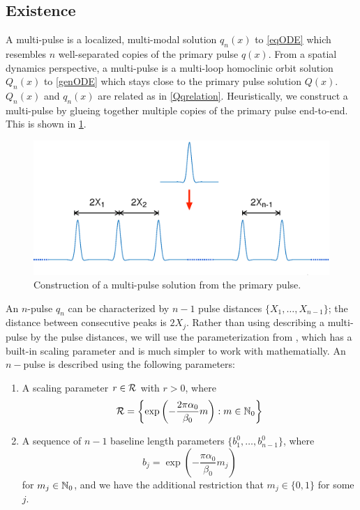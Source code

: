 \documentclass[thesis.tex]{subfiles}
\begin{document}
\subsection{Existence}\label{sec:multiexistR}

A multi-pulse is a localized, multi-modal solution $q_n(x)$ to \cref{eqODE} which resembles $n$ well-separated copies of the primary pulse $q(x)$. From a spatial dynamics perspective, a multi-pulse is a multi-loop homoclinic orbit solution $Q_n(x)$ to \eqref{genODE} which stays close to the primary pulse solution $Q(x)$. $Q_n(x)$ and $q_n(x)$ are related as in \cref{Qqrelation}. Heuristically, we construct a multi-pulse by glueing together multiple copies of the primary pulse end-to-end. This is shown in \cref{fig:multipulsediag}.

\begin{figure}[H]
\includegraphics[width=12cm]{images/kdv5numerics/multipulse.eps}
\caption{Construction of a multi-pulse solution from the primary pulse.}
\label{fig:multipulsediag}
\end{figure}

An $n$-pulse $q_n$ can be characterized by $n-1$ pulse distances $\{ X_1, \dots, X_{n-1} \}$; the distance between consecutive peaks is $2 X_j$. Rather than using describing a multi-pulse by the pulse distances, we will use the parameterization from \cite{SandstedeStrut}, which has a built-in scaling parameter and is much simpler to work with mathematially. An $n-$pulse is described using the following parameters:
\begin{enumerate}
\item A scaling parameter $r \in \mathcal{R}$ with $r > 0$, where
\[
\mathcal{R} = \left\{ \mathop\mathrm{exp}\nolimits\left(-\frac{2 \pi \alpha_0}{\beta_0}m \right) : m \in \mathbb{N}_0 \right\}
\]
\item A sequence of $n-1$ baseline length parameters $\{ b_1^0, \dots, b_{n-1}^0 \}$, where 
\[
b_j = \exp\left(-\frac{\pi \alpha_0}{\beta_0}m_j \right)
\]
for $m_j \in \mathbb{N}_0$, and we have the additional restriction that $m_j \in \{0, 1\}$ for some $j$.
\end{enumerate}
\end{document}

